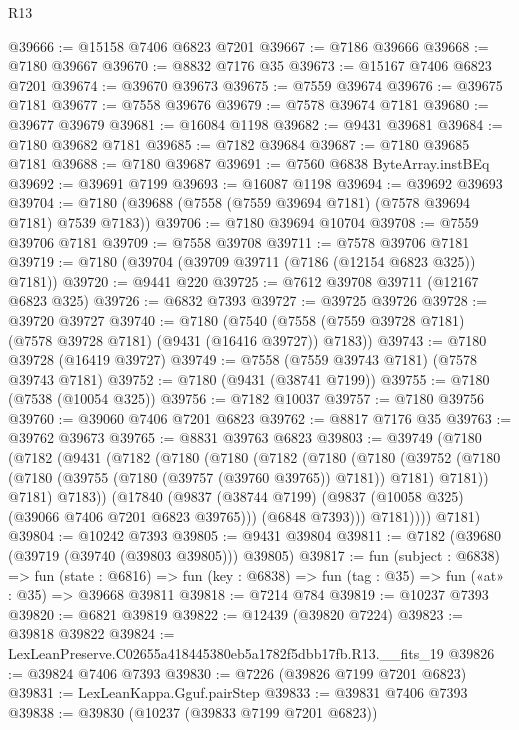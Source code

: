 \begin{lexlean}{R13}
\begin{coremodule}
@39666 := @15158 @7406 @6823 @7201
@39667 := @7186 @39666
@39668 := @7180 @39667
@39670 := @8832 @7176 @35
@39673 := @15167 @7406 @6823 @7201
@39674 := @39670 @39673
@39675 := @7559 @39674
@39676 := @39675 @7181
@39677 := @7558 @39676
@39679 := @7578 @39674 @7181
@39680 := @39677 @39679
@39681 := @16084 @1198
@39682 := @9431 @39681
@39684 := @7180 @39682 @7181
@39685 := @7182 @39684
@39687 := @7180 @39685 @7181
@39688 := @7180 @39687
@39691 := @7560 @6838 ByteArray.instBEq
@39692 := @39691 @7199
@39693 := @16087 @1198
@39694 := @39692 @39693
@39704 := @7180 (@39688 (@7558 (@7559 @39694 @7181) (@7578 @39694 @7181) @7539 @7183))
@39706 := @7180 @39694 @10704
@39708 := @7559 @39706 @7181
@39709 := @7558 @39708
@39711 := @7578 @39706 @7181
@39719 := @7180 (@39704 (@39709 @39711 (@7186 (@12154 @6823 @325)) @7181))
@39720 := @9441 @220
@39725 := @7612 @39708 @39711 (@12167 @6823 @325)
@39726 := @6832 @7393
@39727 := @39725 @39726
@39728 := @39720 @39727
@39740 := @7180
    (@7540 (@7558 (@7559 @39728 @7181) (@7578 @39728 @7181) (@9431 (@16416 @39727)) @7183))
@39743 := @7180 @39728 (@16419 @39727)
@39749 := @7558 (@7559 @39743 @7181) (@7578 @39743 @7181)
@39752 := @7180 (@9431 (@38741 @7199))
@39755 := @7180 (@7538 (@10054 @325))
@39756 := @7182 @10037
@39757 := @7180 @39756
@39760 := @39060 @7406 @7201 @6823
@39762 := @8817 @7176 @35
@39763 := @39762 @39673
@39765 := @8831 @39763 @6823
@39803 := @39749
    (@7180
      (@7182
        (@9431
          (@7182
            (@7180
              (@7180
                (@7182
                  (@7180
                    (@7180
                      (@39752
                        (@7180 (@7180 (@39755 (@7180 (@39757 (@39760 @39765)) @7181)) @7181) @7181))
                      @7181)
                    @7183))
                (@17840
                  (@9837 (@38744 @7199) (@9837 (@10058 @325) (@39066 @7406 @7201 @6823 @39765)))
                  (@6848 @7393)))
              @7181))))
      @7181)
@39804 := @10242 @7393
@39805 := @9431 @39804
@39811 := @7182 (@39680 (@39719 (@39740 (@39803 @39805))) @39805)
@39817 := fun (subject : @6838) =>
  fun (state : @6816) => fun (key : @6838) => fun (tag : @35) => fun («at» : @35) => @39668 @39811
@39818 := @7214 @784
@39819 := @10237 @7393
@39820 := @6821 @39819
@39822 := @12439 (@39820 @7224)
@39823 := @39818 @39822
@39824 := LexLeanPreserve.C02655a418445380eb5a1782f5dbb17fb.R13.__fits_19
@39826 := @39824 @7406 @7393
@39830 := @7226 (@39826 @7199 @7201 @6823)
@39831 := LexLeanKappa.Gguf.pairStep
@39833 := @39831 @7406 @7393
@39838 := @39830 (@10237 (@39833 @7199 @7201 @6823))

\end{coremodule}
\end{lexlean}

